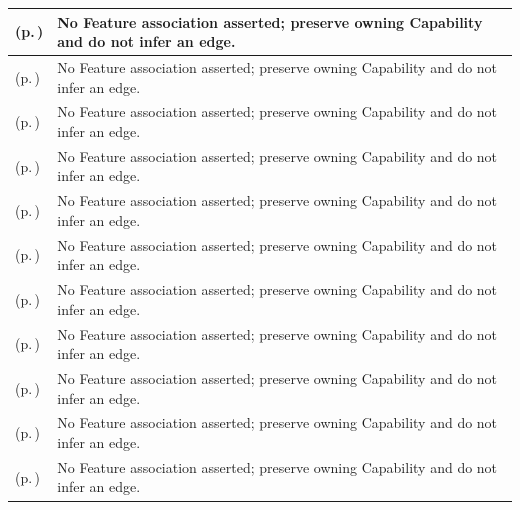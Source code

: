 \begin{longtable}{|>{\raggedright\arraybackslash}p{0.38\TableWidth}|>{\raggedright\arraybackslash}p{0.62\TableWidth}|}
\nameref{function:route-acute-critical-result-alert} (p.\,\pageref{function:route-acute-critical-result-alert}) & No Feature association asserted; preserve owning Capability and do not infer an edge.\\\hline
\nameref{service:acute-clinical-alert-dispatch} (p.\,\pageref{service:acute-clinical-alert-dispatch}) & No Feature association asserted; preserve owning Capability and do not infer an edge.\\\hline
\nameref{function:assemble-inpatient-discharge-dossier} (p.\,\pageref{function:assemble-inpatient-discharge-dossier}) & No Feature association asserted; preserve owning Capability and do not infer an edge.\\\hline
\nameref{service:discharge-dossier-packaging-service} (p.\,\pageref{service:discharge-dossier-packaging-service}) & No Feature association asserted; preserve owning Capability and do not infer an edge.\\\hline
\nameref{function:receive-diagnostic-requisition-feed} (p.\,\pageref{function:receive-diagnostic-requisition-feed}) & No Feature association asserted; preserve owning Capability and do not infer an edge.\\\hline
\nameref{service:modality-worklist-distribution} (p.\,\pageref{service:modality-worklist-distribution}) & No Feature association asserted; preserve owning Capability and do not infer an edge.\\\hline
\nameref{function:publish-governed-diagnostic-report} (p.\,\pageref{function:publish-governed-diagnostic-report}) & No Feature association asserted; preserve owning Capability and do not infer an edge.\\\hline
\nameref{service:diagnostic-publication-service} (p.\,\pageref{service:diagnostic-publication-service}) & No Feature association asserted; preserve owning Capability and do not infer an edge.\\\hline
\nameref{function:correlate-adverse-reaction-allergy-profile} (p.\,\pageref{function:correlate-adverse-reaction-allergy-profile}) & No Feature association asserted; preserve owning Capability and do not infer an edge.\\\hline
\nameref{service:allergy-adverse-reaction-query} (p.\,\pageref{service:allergy-adverse-reaction-query}) & No Feature association asserted; preserve owning Capability and do not infer an edge.\\\hline
\nameref{function:project-screening-eligibility-timeline} (p.\,\pageref{function:project-screening-eligibility-timeline}) & No Feature association asserted; preserve owning Capability and do not infer an edge.\\\hline

\end{longtable}

